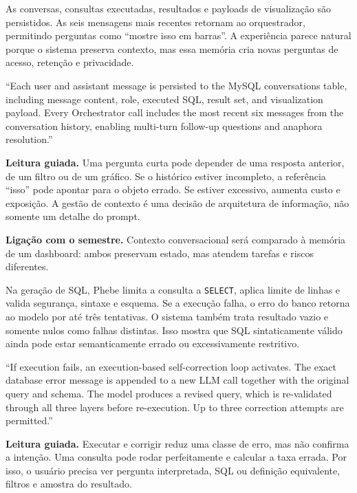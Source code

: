 As conversas, consultas executadas, resultados e payloads de visualização são persistidos. As seis mensagens mais recentes retornam ao orquestrador, permitindo perguntas como ``mostre isso em barras''. A experiência parece natural porque o sistema preserva contexto, mas essa memória cria novas perguntas de acesso, retenção e privacidade.

\begin{ArticleBox}
``Each user and assistant message is persisted to the MySQL conversations table, including message content, role, executed SQL, result set, and visualization payload. Every Orchestrator call includes the most recent six messages from the conversation history, enabling multi-turn follow-up questions and anaphora resolution.''
\end{ArticleBox}

\noindent\textbf{Leitura guiada.} Uma pergunta curta pode depender de uma resposta anterior, de um filtro ou de um gráfico. Se o histórico estiver incompleto, a referência ``isso'' pode apontar para o objeto errado. Se estiver excessivo, aumenta custo e exposição. A gestão de contexto é uma decisão de arquitetura de informação, não somente um detalhe do prompt.

\noindent\textbf{Ligação com o semestre.} Contexto conversacional será comparado à memória de um dashboard: ambos preservam estado, mas atendem tarefas e riscos diferentes.

Na geração de SQL, Phebe limita a consulta a \texttt{SELECT}, aplica limite de linhas e valida segurança, sintaxe e esquema. Se a execução falha, o erro do banco retorna ao modelo por até três tentativas. O sistema também trata resultado vazio e somente nulos como falhas distintas. Isso mostra que SQL sintaticamente válido ainda pode estar semanticamente errado ou excessivamente restritivo.

\begin{ArticleBox}
``If execution fails, an execution-based self-correction loop activates. The exact database error message is appended to a new LLM call together with the original query and schema. The model produces a revised query, which is re-validated through all three layers before re-execution. Up to three correction attempts are permitted.''
\end{ArticleBox}

\noindent\textbf{Leitura guiada.} Executar e corrigir reduz uma classe de erro, mas não confirma a intenção. Uma consulta pode rodar perfeitamente e calcular a taxa errada. Por isso, o usuário precisa ver pergunta interpretada, SQL ou definição equivalente, filtros e amostra do resultado.

